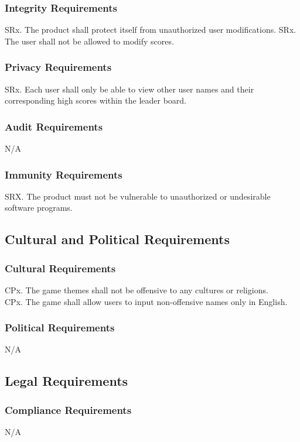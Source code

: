 \documentclass[12pt]{article}
\begin{document}
    \subsubsection{Integrity Requirements}
    SRx. The product shall protect itself from unauthorized user modifications.
    SRx. The user shall not be allowed to modify scores.
    
    \subsubsection{Privacy Requirements}
    SRx. Each user shall only be able to view other user names and their corresponding high scores within the leader board.
    
    \subsubsection{Audit Requirements}
    N/A
    
    \subsubsection{Immunity Requirements}
    SRX. The product must not be vulnerable to unauthorized or undesirable software programs.
    
\subsection{Cultural and Political Requirements}
    \subsubsection{Cultural Requirements}
    CPx. The game themes shall not be offensive to any cultures or religions. \\
    CPx. The game shall allow users to input non-offensive names only in English.

    \subsubsection{Political Requirements}    N/A
    
\subsection{Legal Requirements}
    \subsubsection{Compliance Requirements}
    N/A
    
\end{document}

